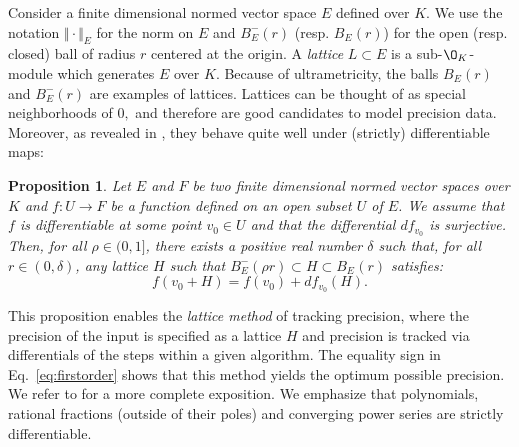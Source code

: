 \documentclass[sigconf]{acmart}
\newcommand{\OK}{\mathcal{O}_K}
\newtheorem{prop}[theo]{Proposition}
\theoremstyle{definition}
\begin{document}
Consider a finite 
dimensional normed vector space $E$ 
defined over $K$. 
We use the notation $\Vert \cdot \Vert_E$ for the norm 
on $E$ and $B^-_E(r)$ (resp. $B^{\phantom -}_E(r)$) for the open (resp. 
closed) ball of radius $r$ centered at the origin. A \emph{lattice} $L \subset 
E$ is a sub-$\O_K$-module which generates $E$ over $K$. 
Because of ultrametricity, the balls $B^{\phantom 
-}_E(r)$ and $B^-_E(r)$ are examples of lattices. 
Lattices can be thought of as special neighborhoods of $0,$
 and therefore are good 
candidates to model precision data. Moreover, as revealed in 
\cite{caruso-roe-vaccon:14a}, they behave quite well under (strictly) 
differentiable maps:

\begin{prop}
\label{prop:precision}
Let $E$ and $F$ be two finite dimensional normed vector spaces over $K$ 
and $f : U \rightarrow F$ be a function defined on an open subset $U$ of 
$E$. We assume that $f$ is differentiable at some point $v_0 \in U$ and 
that the differential $df_{v_0}$ is surjective.
Then, for all $\rho \in (0, 1]$, there exists a positive real
number $\delta$ such that, for all $r \in (0, \delta)$, any lattice
$H$ such that $B^-_E(\rho r) \subset H \subset B^{\phantom -}_E(r)$ 
satisfies:
\begin{equation}
\label{eq:firstorder}
f(v_0 + H) = f(v_0) + df_{v_0} (H).
\end{equation}
\end{prop}

This proposition enables the \emph{lattice method} of tracking precision,
where the precision of the input is specified as a lattice $H$ and precision
is tracked via differentials of the steps within a given algorithm.
The equality sign in Eq.~\eqref{eq:firstorder} shows that this method
yields the optimum possible precision. 
We refer to \cite[\S 4.1]{caruso-roe-vaccon:14a} for a more complete 
exposition.
We emphasize that polynomials, rational fractions (outside of their poles)
and converging power series are strictly differentiable.

%
\end{document}
